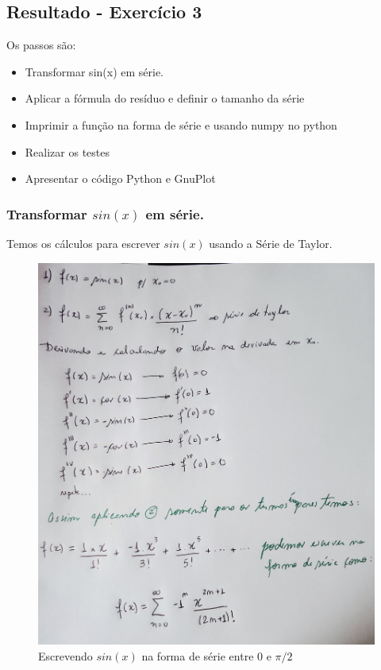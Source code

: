 \subsection{Resultado - Exercício 3}

Os passos são:
\begin{itemize}[leftmargin=3.5em, itemsep=-.5mm, topsep=0.5mm]
    \item Transformar sin(x) em série.
    \item Aplicar a fórmula do resíduo e definir o tamanho da série
    \item Imprimir a função na forma de série e usando numpy no python
    \item Realizar os testes
    \item Apresentar o código Python e GnuPlot
 \end{itemize}

\newpage

\subsubsection{Transformar $sin(x)$ em série.}
Temos os cálculos para escrever $sin(x)$ usando a Série de Taylor.
\begin{figure}[H]
    \centering
    \includegraphics[width=1.0\textwidth]{imagens/exercicio3_parte_1}
    \caption{Escrevendo $sin(x)$ na forma de série entre $0$ e $\pi/2$}
    \label{fig:lista_exercicio3_parte1}
\end{figure}
\newpage

